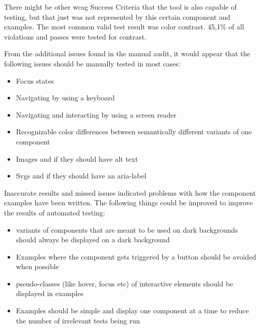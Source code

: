 \documentclass{master_thesis}
\begin{document}
There might be other \ac{wcag} Success Criteria that the tool is also capable of testing, but that just was not represented by this certain component and examples. The most common valid test result was color contrast. 45,1\% of all violations and passes were tested for contrast.

From the additional issues found in the manual audit, it would appear that the following issues should be manually tested in most cases:
\begin{itemize}
	\item Focus states
	\item Navigating by using a keyboard
	\item Navigating and interacting by using a screen reader
	\item Recognizable color differences between semantically different variants of one component
	\item Images and if they should have alt text
	\item Svgs and if they should have an aria-label
\end{itemize}

Inaccurate results and missed issues indicated problems with how the component examples have been written. The following things could be improved to improve the results of automated testing:
\begin{itemize}
	\item variants of components that are meant to be used on dark backgrounds should always be displayed on a dark background
	\item Examples where the component gets triggered by a button should be avoided when possible
	\item pseudo-classes (like hover, focus etc) of interactive elements should be displayed in examples
	\item Examples should be simple and display one component at a time to reduce the number of irrelevant tests being run
\end{itemize}

\end{document}
